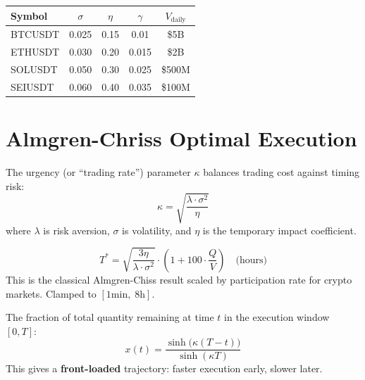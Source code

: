\documentclass[11pt,a4paper]{article}
\begin{document}
\begin{formulabox}[title={\S1.5 — Calibrated Parameters}]
\begin{center}
\begin{tabular}{lcccc}
\toprule
\textbf{Symbol} & $\sigma$ & $\eta$ & $\gamma$ & $V_{\text{daily}}$ \\
\midrule
BTCUSDT  & 0.025 & 0.15 & 0.01 & \$5B  \\
ETHUSDT  & 0.030 & 0.20 & 0.015 & \$2B \\
SOLUSDT  & 0.050 & 0.30 & 0.025 & \$500M \\
SEIUSDT  & 0.060 & 0.40 & 0.035 & \$100M \\
\bottomrule
\end{tabular}
\end{center}
\end{formulabox}


\section{Almgren-Chriss Optimal Execution}

\begin{formulabox}[title={\S2.1 — Urgency Parameter}]
The urgency (or ``trading rate'') parameter $\kappa$ balances trading cost against timing risk:
\begin{equation}
  \kappa = \sqrt{\frac{\lambda \cdot \sigma^2}{\eta}}
\end{equation}
where $\lambda$ is risk aversion, $\sigma$ is volatility, and $\eta$ is the temporary impact coefficient.
\end{formulabox}

\begin{formulabox}[title={\S2.2 — Optimal Execution Time}]
\begin{equation}
  T^{*} = \sqrt{\frac{3\eta}{\lambda \cdot \sigma^2}} \cdot \left(1 + 100 \cdot \frac{Q}{V}\right) \quad \text{(hours)}
\end{equation}
This is the classical Almgren-Chiss result scaled by participation rate for crypto markets. Clamped to $[1\text{min},\; 8\text{h}]$.
\end{formulabox}

\begin{formulabox}[title={\S2.3 — Optimal Trading Trajectory}]
The fraction of total quantity remaining at time $t$ in the execution window $[0, T]$:
\begin{equation}
  x(t) = \frac{\sinh\!\bigl(\kappa(T - t)\bigr)}{\sinh(\kappa T)}
\end{equation}
This gives a \textbf{front-loaded} trajectory: faster execution early, slower later.
\end{formulabox}
\end{document}
